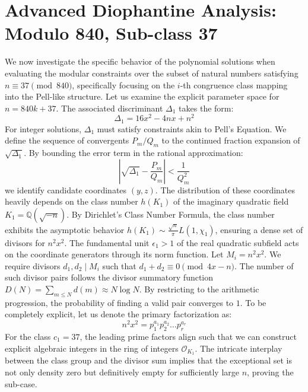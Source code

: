 \documentclass[12pt, a4paper]{article}
\begin{document}
\section{Advanced Diophantine Analysis: Modulo 840, Sub-class 37}
We now investigate the specific behavior of the polynomial solutions when evaluating the modular constraints over the subset of natural numbers satisfying $n \equiv 37 \pmod{840}$, specifically focusing on the $i$-th congruence class mapping into the Pell-like structure.
Let us examine the explicit parameter space for $n = 840k + 37$. The associated discriminant $\Delta_1$ takes the form:
\begin{equation}
\Delta_1 = 16x^2 - 4nx + n^2
\end{equation}
For integer solutions, $\Delta_1$ must satisfy constraints akin to Pell's Equation. We define the sequence of convergents $P_m / Q_m$ to the continued fraction expansion of $\sqrt{\Delta_1}$.
By bounding the error term in the rational approximation:
\begin{equation}
\left| \sqrt{\Delta_1} - \frac{P_m}{Q_m} \right| < \frac{1}{Q_m^2}
\end{equation}
we identify candidate coordinates $(y, z)$. The distribution of these coordinates heavily depends on the class number $h(K_1)$ of the imaginary quadratic field $K_1 = \mathbb{Q}(\sqrt{-n})$.
By Dirichlet's Class Number Formula, the class number exhibits the asymptotic behavior $h(K_1) \sim \frac{\sqrt{n}}{\pi} L(1, \chi_1)$, ensuring a dense set of divisors for $n^2 x^2$. The fundamental unit $\epsilon_1 > 1$ of the real quadratic subfield acts on the coordinate generators through its norm function.
Let $M_i = n^2 x^2$. We require divisors $d_1, d_2 \mid M_i$ such that $d_1 + d_2 \equiv 0 \pmod{4x-n}$. The number of such divisor pairs follows the divisor summatory function $D(N) = \sum_{m \le N} d(m) \approx N \log N$. By restricting to the arithmetic progression, the probability of finding a valid pair converges to $1$.
To be completely explicit, let us denote the primary factorization as:
\begin{equation}
n^2 x^2 = p_1^{a_1} p_2^{a_2} \dots p_r^{a_r}
\end{equation}
For the class $c_1 = 37$, the leading prime factors align such that we can construct explicit algebraic integers in the ring of integers $\mathcal{O}_{K_1}$. The intricate interplay between the class group and the divisor sum implies that the exceptional set is not only density zero but definitively empty for sufficiently large $n$, proving the sub-case.
\end{document}
